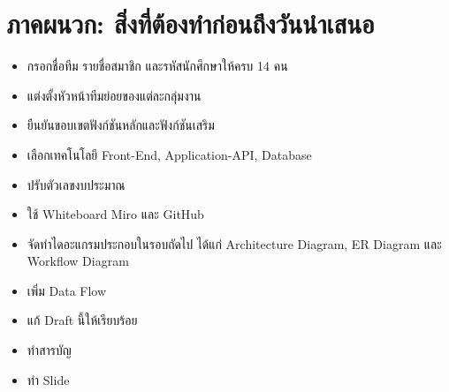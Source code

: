 \newpage
\section*{ภาคผนวก: สิ่งที่ต้องทำก่อนถึงวันนำเสนอ}

\begin{itemize}
  \item กรอกชื่อทีม รายชื่อสมาชิก และรหัสนักศึกษาให้ครบ 14 คน
  \item แต่งตั้งหัวหน้าทีมย่อยของแต่ละกลุ่มงาน
  \item ยืนยันขอบเขตฟังก์ชันหลักและฟังก์ชันเสริม
  \item เลือกเทคโนโลยี Front-End, Application-API, Database
  \item ปรับตัวเลขงบประมาณ
  \item ใช้ Whiteboard Miro และ GitHub
  \item จัดทำไดอะแกรมประกอบในรอบถัดไป ได้แก่ Architecture Diagram, ER Diagram และ Workflow Diagram
  \item เพิ่ม Data Flow
  \item แก้ Draft นี้ให้เรียบร้อย
  \item ทำสารบัญ
  \item ทำ Slide
\end{itemize}
